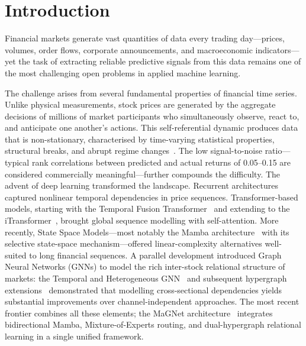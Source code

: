 \documentclass[a4paper,11pt]{report}
\begin{document}
\fontsize{11}{15}\selectfont

\pagestyle{empty}







\newpage

\tableofcontents 
{}
\listoftables
\listoffigures





\chapter{Introduction} 
\label{ch:Introduction}


Financial markets generate vast quantities of data every trading day---prices, volumes, order flows, corporate announcements, and macroeconomic indicators---yet the task of extracting reliable predictive signals from this data remains one of the most challenging open problems in applied machine learning.

The challenge arises from several fundamental properties of financial time series. Unlike physical measurements, stock prices are generated by the aggregate decisions of millions of market participants who simultaneously observe, react to, and anticipate one another's actions. This self-referential dynamic produces data that is non-stationary, characterised by time-varying statistical properties, structural breaks, and abrupt regime changes~\cite{zhu2025msgformer}. The low signal-to-noise ratio---typical rank correlations between predicted and actual returns of 0.05--0.15 are considered commercially meaningful---further compounds the difficulty.
The advent of deep learning transformed the landscape. Recurrent architectures captured nonlinear temporal dependencies in price sequences. Transformer-based models, starting with the Temporal Fusion Transformer~\cite{lim2020tft} and extending to the iTransformer~\cite{liu2024itransformer}, brought global sequence modelling with self-attention. More recently, State Space Models---most notably the Mamba architecture~\cite{gu2024mamba} with its selective state-space mechanism---offered linear-complexity alternatives well-suited to long financial sequences. A parallel development introduced Graph Neural Networks (GNNs) to model the rich inter-stock relational structure of markets: the Temporal and Heterogeneous GNN~\cite{xiang2022thgnn} and subsequent hypergraph extensions~\cite{sawhney2021sthan,liao2024dhstn} demonstrated that modelling cross-sectional dependencies yields substantial improvements over channel-independent approaches. The most recent frontier combines all these elements; the MaGNet architecture~\cite{tan2025magnet} integrates bidirectional Mamba, Mixture-of-Experts routing, and dual-hypergraph relational learning in a single unified framework.
\end{document}
